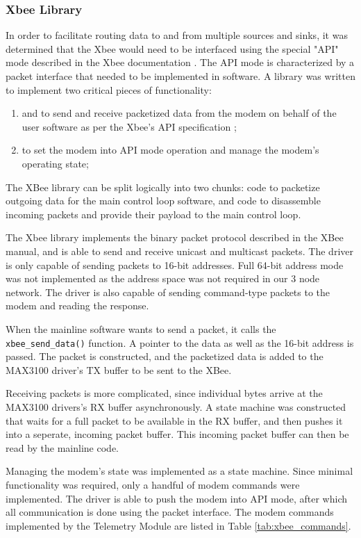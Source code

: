 \subsubsection{Xbee Library}

In order to facilitate routing data to and from multiple sources and sinks, it was determined that the Xbee would need to be interfaced using the special "API" mode described in the Xbee documentation \cite{XBeeManual}. The API mode is characterized by a packet interface that needed to be implemented in software. A library was written to implement two critical pieces of functionality:

\begin{enumerate}
\item and to send and receive packetized data from the modem on behalf of the user software as per the Xbee's API specification \cite{XBeeManual};
\item to set the modem into API mode operation and manage the modem's operating state;
\end{enumerate}

The XBee library can be split logically into two chunks: code to packetize outgoing data for the main control loop software, and code to disassemble incoming packets and provide their payload to the main control loop.

The Xbee library implements the binary packet protocol described in the XBee manual, and is able to send and receive unicast and multicast packets. The driver is only capable of sending packets to 16-bit addresses. Full 64-bit address mode was not implemented as the address space was not required in our 3 node network. The driver is also capable of sending command-type packets to the modem and reading the response.

When the mainline software wants to send a packet, it calls the \verb|xbee_send_data()| function. A pointer to the data as well as the 16-bit address is passed. The packet is constructed, and the packetized data is added to the MAX3100 driver's TX buffer to be sent to the XBee.

Receiving packets is more complicated, since individual bytes arrive at the MAX3100 drivers's RX buffer asynchronously. A state machine was constructed that waits for a full packet to be available in the RX buffer, and then pushes it into a seperate, incoming packet buffer. This incoming packet buffer can then be read by the mainline code.

Managing the modem's state was implemented as a state machine. Since minimal functionality was required, only a handful of modem commands were implemented. The driver is able to push the modem into API mode, after which all communication is done using the packet interface. The modem commands implemented by the Telemetry Module are listed in Table \ref{tab:xbee_commands}.

